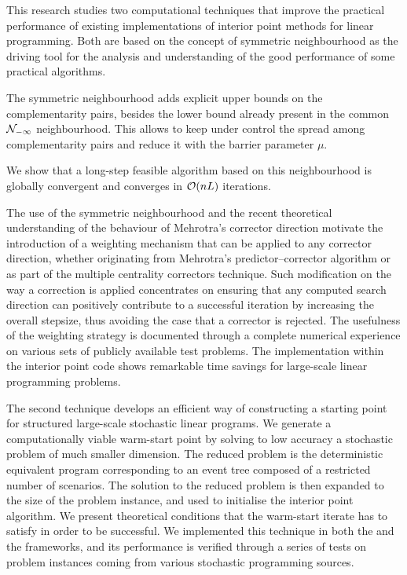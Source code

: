 
%
%

This research studies two computational techniques that improve
the practical performance of existing implementations 
of interior point methods for linear programming.
Both are based on the concept of symmetric neighbourhood 
as the driving tool for the analysis and understanding of the good 
performance of some practical algorithms. 

The symmetric neighbourhood adds explicit upper bounds
on the complementarity pairs, besides the lower bound already
present in the common $\mathcal{N}_{-\infty}$ neighbourhood.
This allows to keep under control the spread among 
complementarity pairs and reduce it with the barrier parameter $\mu$.
We show that a long-step feasible algorithm based on 
this neighbourhood is globally convergent and
converges in $\mathcal{O}(nL)$ iterations.

The use of the symmetric neighbourhood and the recent
theoretical understanding of the behaviour of Mehrotra's
corrector direction motivate the introduction of a weighting
mechanism that can be applied to any corrector direction,
whether originating from Mehrotra's predictor--corrector algorithm
or as part of the multiple centrality correctors technique.
Such modification on the way a correction is applied
concentrates on ensuring that any computed search direction can positively
contribute to a successful iteration by increasing the overall
stepsize, thus avoiding the case that a corrector is rejected.
The usefulness of the weighting strategy is documented through
a complete numerical experience on various sets of publicly
available test problems.
The implementation within the \HOPDM interior point code
shows remarkable time savings for large-scale linear programming problems.

The second technique develops an efficient way of 
constructing a starting point for structured large-scale 
stochastic linear programs.
We generate a computationally viable warm-start point by solving 
to low accuracy a stochastic problem of much smaller dimension.
The reduced problem is the deterministic equivalent program
corresponding to an event tree composed of a restricted number
of scenarios.
The solution to the reduced problem is then expanded to the
size of the problem instance, and used to initialise the
interior point algorithm.
We present theoretical conditions that the warm-start iterate
has to satisfy in order to be successful.
We implemented this technique in both the \HOPDM and the \OOPS
frameworks, and its performance is verified through 
a series of tests on problem instances coming from various stochastic
programming sources.
